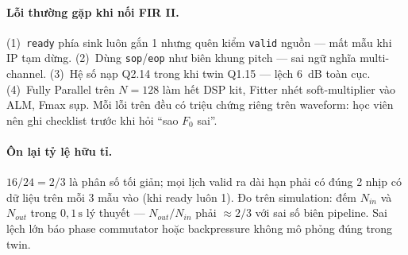 \paragraph{Lỗi thường gặp khi nối FIR II.} (1)~\texttt{ready} phía sink luôn gắn 1 nhưng quên kiểm \texttt{valid} nguồn --- mất mẫu khi IP tạm dừng. (2)~Dùng \texttt{sop}/\texttt{eop} như biên khung pitch --- sai ngữ nghĩa multi-channel. (3)~Hệ số nạp Q2.14 trong khi twin Q1.15 --- lệch 6~dB toàn cục. (4)~Fully Parallel trên $N=128$ làm hết DSP kit, Fitter nhét soft-multiplier vào ALM, Fmax sụp. Mỗi lỗi trên đều có triệu chứng riêng trên waveform: học viên nên ghi checklist trước khi hỏi ``sao $F_0$ sai''.


\paragraph{Ôn lại tỷ lệ hữu tỉ.} $16/24=2/3$ là phân số tối giản; mọi lịch valid ra dài hạn phải có đúng 2 nhịp có dữ liệu trên mỗi 3 mẫu vào (khi ready luôn 1). Đo trên simulation: đếm $N_{in}$ và $N_{out}$ trong $0{,}1\,\text{s}$ lý thuyết --- $N_{out}/N_{in}$ phải $\approx 2/3$ với sai số biên pipeline. Sai lệch lớn báo phase commutator hoặc backpressure không mô phỏng đúng trong twin.
